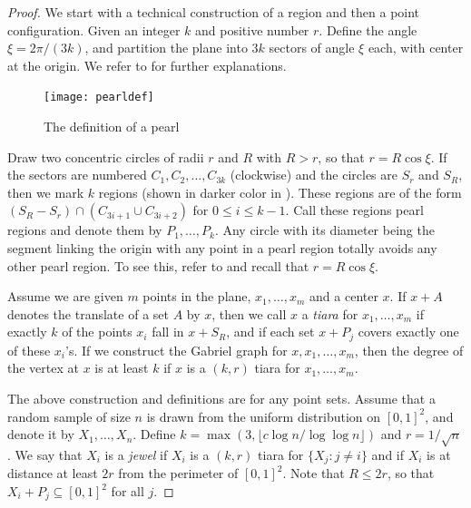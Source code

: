 \documentclass[10pt]{llncs}
\begin{document}
\begin{proof}
We start with a technical construction of a region
and then a point configuration.
Given an integer $k$ and positive number $r$.
Define the angle $\xi = 2\pi / (3k)$,
and partition the plane into $3k$ sectors
of angle $\xi$ each, with center at the origin.
We refer to  for further explanations.

\begin{figure}[htbp]
\begin{center}\texttt{[image: pearldef]}\end{center}
\caption{The definition of a pearl}
\end{figure}

Draw two concentric circles of radii $r$ and $R$
with $R > r$, so that $r = R \cos \xi$.
If the sectors are numbered $C_1, C_2, \ldots, C_{3k}$
(clockwise)
and the circles are $S_r$ and $S_R$, then we
mark $k$ regions (shown in darker color in ). These regions are of the form
$(S_R - S_r) \cap (C_{3i+1} \cup C_{3i+2})$ for
$0 \le i \le k-1$. 
Call these regions pearl regions
and denote them by $P_1 , \ldots, P_k$.
Any circle with
its diameter being the segment linking the origin with
any point in a pearl region totally avoids any other
pearl region. To see this, refer to 
and recall that $r = R \cos \xi$.

Assume we are given $m$ points in the plane,
$x_1,\ldots,x_m$ and a center $x$.
If $x+A$ denotes the translate of a set $A$ by $x$,
then we call $x$ a {\it tiara} for $x_1 , \ldots , x_m$
if exactly $k$ of the points $x_i$ fall in $x+S_R$,
and if each set $x+P_j$ covers exactly one of
these $x_i$'s.
If we construct the Gabriel graph for $x,x_1,\ldots,x_m$,
then the degree of the vertex at $x$ is at least $k$
if $x$ is a $(k,r)$ tiara for $x_1,\ldots,x_m$.

The above construction and definitions are
for any point sets.
Assume that a random sample of size $n$ is drawn
from the uniform distribution on $[0,1]^2$,
and denote it by $X_1 , \ldots, X_n$.
Define $k = \max( 3, \lfloor c \log n / \log \log n \rfloor)$
and $r = 1/\sqrt{n}$.
We say that $X_i$ is a {\it jewel}
if $X_i$ is a $(k,r)$ tiara for $\{ X_j : j \not= i \}$
and if $X_i$ is at distance at least $2r$ from the
perimeter of $[0,1]^2$. Note that $R \le 2r$, so that
$X_i + P_j \subseteq [0,1]^2$ for all $j$.


\end{proof}
\end{document}
